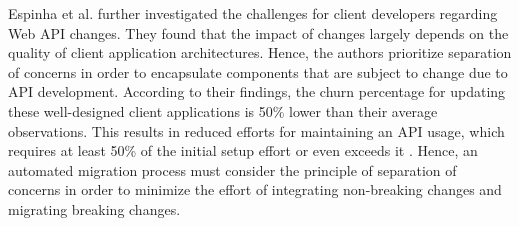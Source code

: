 Espinha et al. \cite{espinha_web_2014} further investigated the challenges for client developers regarding Web API changes. They found that the impact of changes largely depends on the quality of client application architectures. Hence, the authors prioritize separation of concerns in order to encapsulate components that are subject to change due to API development. According to their findings, the churn percentage for updating these well-designed client applications is 50\% lower than their average observations. This results in reduced efforts for maintaining an API usage, which requires at least 50\% of the initial setup effort or even exceeds it \cite{espinha_web_2014}. Hence, an automated migration process must consider the principle of separation of concerns in order to minimize the effort of integrating non-breaking changes and migrating breaking changes.